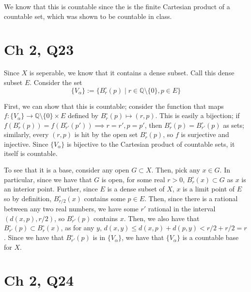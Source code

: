 \documentclass[12pt,letterpaper]{article}
\theoremstyle{definition}
\newcommand{\Q}{\mathbb{Q}}
\begin{document}
We know that this is countable since the is the finite Cartesian product of a countable set, which was shown to be countable in class.

\section*{Ch 2, Q23}

Since $X$ is seperable, we know that it contains a dense subset. Call this dense subset $E$. Consider the set
\[
  \{V_{\alpha}\} := \{B_{r}^{\circ}(p) \mid r \in \Q \setminus \{0\}, p \in E\}
\]

First, we can show that this is countable; consider the function that maps $f: \{V_{\alpha}\} \rightarrow \Q \setminus \{0\} \times E$ defined by $B_{r}^{\circ}(p) \mapsto (r, p)$. This is easily a bijection; if $f(B_{r}^{\circ}(p)) = f(B_{r'}^{\circ}(p')) \implies r = r', p = p'$, then $B_{r}^{\circ}(p) = B_{r'}^{\circ}(p)$ as sets; similarly, every $(r, p)$ is hit by the open set $B_{r}^{\circ}(p)$, so $f$ is surjective and injective. Since $\{V_{\alpha}\}$ is bijective to the Cartesian product of countable sets, it itself is countable.

To see that it is a base, consider any open $G \subset X$. Then, pick any $x \in G$. In particular, since we have that $G$ is open, for some real $r > 0$, $B_{r}^{\circ}(x) \subset G$ as $x$ is an interior point. Further, since $E$ is a dense subset of $X$, $x$ is a limit point of $E$ so by definition, $B_{r/2}^{\circ}(x)$ contains some $p \in E$. Then, since there is a rational between any two real numbers, we have some $r'$ rational in the interval $(d(x,p), r / 2)$, so $B_{r'}^{\circ}(p)$ contains $x$. Then, we also have that $B_{r'}^{\circ}(p) \subset B_{r}^{\circ}(x)$, as for any $y$, $d(x, y) \leq d(x,p) + d(p,y) < r/2 + r/2 = r$. Since we have that $B_{r'}^{\circ}(p)$ is in $\{V_{\alpha}\}$, we have that $\{V_{\alpha}\}$ is a countable base for $X$.

\section*{Ch 2, Q24}
\end{document}
